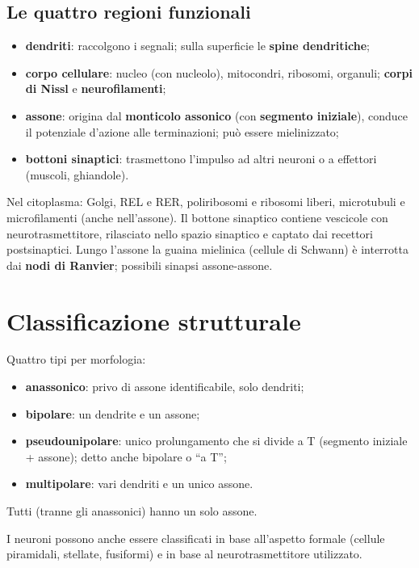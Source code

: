 \subsection{Le quattro regioni funzionali}
\begin{itemize}
  \item \textbf{dendriti}: raccolgono i segnali; sulla superficie le \textbf{spine dendritiche};
  \item \textbf{corpo cellulare}: nucleo (con nucleolo), mitocondri, ribosomi, organuli;
    \textbf{corpi di Nissl} e \textbf{neurofilamenti};
  \item \textbf{assone}: origina dal \textbf{monticolo assonico} (con \textbf{segmento iniziale}),
    conduce il potenziale d'azione alle terminazioni; può essere mielinizzato;
  \item \textbf{bottoni sinaptici}: trasmettono l'impulso ad altri neuroni o a effettori (muscoli,
    ghiandole).
\end{itemize}
Nel citoplasma: Golgi, REL e RER, poliribosomi e ribosomi liberi, microtubuli e microfilamenti
(anche nell'assone). Il bottone sinaptico contiene vescicole con neurotrasmettitore, rilasciato
nello spazio sinaptico e captato dai recettori postsinaptici. Lungo l'assone la guaina mielinica
(cellule di Schwann) è interrotta dai \textbf{nodi di Ranvier}; possibili sinapsi assone-assone.

\section{Classificazione strutturale}

Quattro tipi per morfologia:
\begin{itemize}
  \item \textbf{anassonico}: privo di assone identificabile, solo dendriti;
  \item \textbf{bipolare}: un dendrite e un assone;
  \item \textbf{pseudounipolare}: unico prolungamento che si divide a T (segmento iniziale +
    assone); detto anche bipolare o ``a T'';
  \item \textbf{multipolare}: vari dendriti e un unico assone.
\end{itemize}
Tutti (tranne gli anassonici) hanno un solo assone.

I neuroni possono anche essere classificati in base all'aspetto formale (cellule piramidali,
stellate, fusiformi) e in base al neurotrasmettitore utilizzato.

